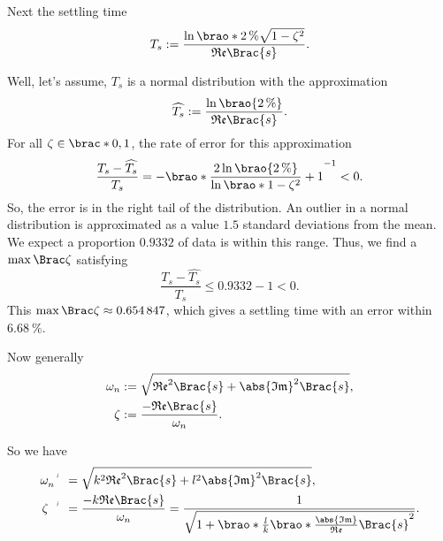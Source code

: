 \documentclass[11pt]{article}
\begin{document}
\begin{adjustwidth}{0.5in}{0in}
        Next the settling time
        \[
            T_s
            := \frac{\ln\brao*{\SI2\percent \sqrt{1 - \zeta^2}}}{\mathfrak{Re}\Brac{s}}.
        \]

        Well, let's assume, \(T_s\) is a normal distribution with the approximation
        \[
            \widehat{T_s}
            := \frac{\ln\brao{\SI2\percent}}{\mathfrak{Re}\Brac{s}}.
        \]
        For all \(\zeta \in \brac*{0,1}\), the rate of error for this approximation
        \[
             \frac{T_s - \widehat{T_s}}{T_s}
             = -\brao*{\frac{2\ln\brao{\SI2\percent}}{\ln\brao*{1 - \zeta^2}} + 1}^{-1}
             < 0.
        \]
        So, the error is in the right tail of the distribution. An outlier in a normal distribution is approximated as a value \(1.5\) standard deviations from the mean. We expect a proportion \(0.9332\) of data is within this range. Thus, we find a \(\max\Brac\zeta\) satisfying
        \[
            \frac{T_s - \widehat{T_s}}{T_s}
            \leq \num{0.9332} - 1
            < 0.
        \]
        This \(\max\Brac\zeta \approx \num{0.654847}\), which gives a settling time with an error within \(\SI{6.68}\percent\).

        Now generally
        \[
            \begin{aligned}
                \omega_n
                    &{}:= \sqrt{\mathfrak{Re}^2\Brac{s} + \abs{\mathfrak{Im}}^2\Brac{s}},
            \\*
                \zeta
                    &{}:= \frac{-\mathfrak{Re}\Brac{s}}{\omega_n}.
            \\*
            \end{aligned}
        \]

        So we have
        \[
            \begin{aligned}
                \setprime{\omega}_n
                    &{}= \sqrt{k^2 \mathfrak{Re}^2\Brac{s} + l^2 \abs{\mathfrak{Im}}^2\Brac{s}},
            \\*
                \setprime\zeta
                    &{}= \frac{-k\mathfrak{Re}\Brac{s}}{\omega_n}
                    = \frac{1}{\sqrt{1 + \brao*{
                        \frac{l}k
                        \brao*{\frac
                            {\abs{\mathfrak{Im}}}
                            {\mathfrak{Re}}
                        }
                        \Brac{s}
                    }^2}}.
            \\*
            \end{aligned}
        \]


\end{adjustwidth}
\end{document}
